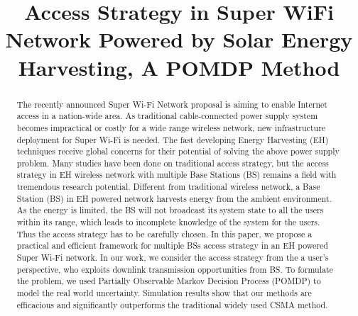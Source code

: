 \documentclass[conference]{IEEEtran}
\begin{document}
\title{Access Strategy in Super WiFi Network Powered by Solar Energy Harvesting, A POMDP Method}

\author{
	\small{}}
\maketitle

\begin{abstract}
The recently announced Super Wi-Fi Network proposal is aiming to enable Internet access in a nation-wide area.
As traditional cable-connected power supply system becomes impractical or costly for a wide range wireless network,
new infrastructure deployment for Super Wi-Fi is needed.
The fast developing Energy Harvesting (EH) techniques receive global
concerns for their potential of solving the above power supply problem.
Many studies have been done on traditional access strategy,
but the access strategy in EH wireless network with multiple Base Stations (BS)
remains a field with tremendous research potential.
Different from traditional wireless network,
a Base Station (BS) in EH powered network harvests energy from the ambient environment.
As the energy is limited,
the BS will not broadcast its system state to all the users within its range,
which leads to incomplete knowledge of the system for the users.
Thus the access strategy has to be carefully chosen.
In this paper, we propose a practical and efficient framework for multiple BSs access strategy
in an EH powered Super Wi-Fi network.
In our work, we consider the access strategy from the a user's perspective,
who exploits downlink transmission opportunities from BS.
To formulate the problem,
we used Partially Observable Markov Decision Process (POMDP) to model the
real world uncertainty.
Simulation results show that our methods are efficacious and significantly outperforms
the traditional widely used CSMA method.
\end{abstract}
\IEEEpeerreviewmaketitle
\end{document}
